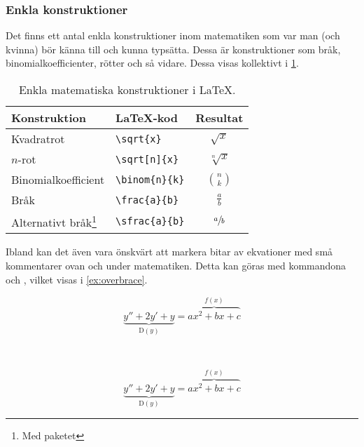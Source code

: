 \documentclass[lang=sv,ptsize=10pt,font=none,nomath,titles=bf,../../a4.tex]{subfiles}
\begin{document}
\subsubsection{Enkla konstruktioner} %
Det finns ett antal enkla konstruktioner inom matematiken som var man
(och kvinna) bör känna till och kunna typsätta. Dessa är konstruktioner
som bråk, binomialkoefficienter, rötter och så vidare. Dessa visas
kollektivt i \cref{tab:math:enkla}.

\begin{table}[p]
	\centering
	\caption{Enkla matematiska konstruktioner i \LaTeX{}.}
	\label{tab:math:enkla}
	\begin{minipage}{0.66\textwidth}
	\centering
	\begin{tabular}{llc}
		\toprule 
		Konstruktion & \LaTeX-kod & Resultat  \\
		\midrule 
		Kvadratrot & \verb|\sqrt{x}| & \(\sqrt{x}\) \\
		\(n\)-rot & \verb|\sqrt[n]{x}| & \(\sqrt[n]{x}\) \\
		Binomialkoefficient & \verb|\binom{n}{k}| & \(\binom{n}{k}\) \\
		Bråk & \verb|\frac{a}{b}| & \(\frac{a}{b}\) \\
		Alternativt bråk\footnote{Med paketet \pack{xfrac}} & \verb|\sfrac{a}{b}| & \(\sfrac{a}{b}\) \\
		\bottomrule 
	\end{tabular}
	\end{minipage}
\end{table}

Ibland kan det även vara önskvärt att markera bitar av ekvationer med små
kommentarer ovan och under matematiken. Detta kan göras med kommandona
 och , vilket visas i \cref{ex:overbrace}.

\begin{kod}[p]
	\centering
	\begin{minipage}{0.8\textwidth} %
		\begin{latexcode}
\begin{equation*}
\underbrace{y'' + 2y' + y}_{\mathrm{D}(y)}
= \overbrace{ax^2+bx+c}^{f(x)}
\end{equation*}
		\end{latexcode}
	\end{minipage}
	\medskip\\
	\begin{minipage}{0.8\textwidth} %
		\begin{equation*}
			\underbrace{y'' + 2y' + y}_{\mathrm{D}(y)}
			= \overbrace{ax^2+bx+c}^{f(x)}
		\end{equation*}
	\end{minipage}		
	\caption{Annotering med  och .}
	\label{ex:overbrace}
\end{kod}
\end{document}
